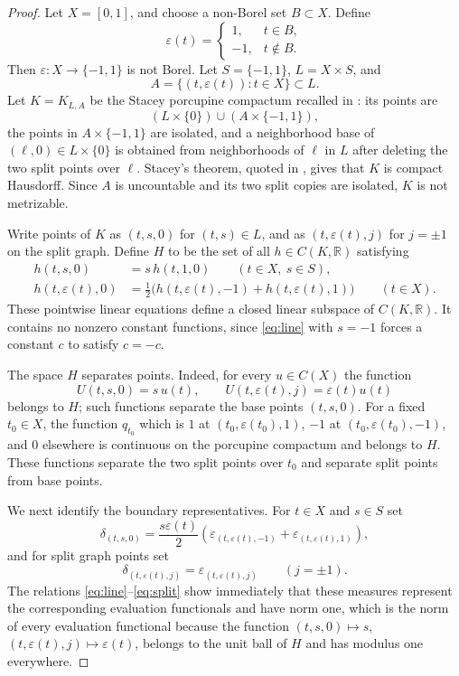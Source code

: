 \documentclass[11pt]{amsart}
\newcommand{\eps}{\varepsilon}
\begin{document}
\begin{proof}
Let \(X=[0,1]\), and choose a non-Borel set \(B\subset X\).  Define
\[
  \eps(t)=
  \begin{cases}
    1, & t\in B,\\
   -1, & t\notin B.
  \end{cases}
\]
Then \(\eps:X\to\{-1,1\}\) is not Borel.  Let \(S=\{-1,1\}\),
\(L=X\times S\), and
\[
  A=\{(t,\eps(t)):t\in X\}\subset L.
\]
Let \(K=K_{L,A}\) be the Stacey porcupine compactum recalled in
\cite[Section 6]{KS}: its points are
\[
  (L\times\{0\})\cup (A\times\{-1,1\}),
\]
the points in \(A\times\{-1,1\}\) are isolated, and a neighborhood base of
\((\ell,0)\in L\times\{0\}\) is obtained from neighborhoods of \(\ell\) in
\(L\) after deleting the two split points over \(\ell\).  Stacey's theorem,
quoted in \cite[Section 6]{KS}, gives that \(K\) is compact Hausdorff.
Since \(A\) is uncountable and its two split copies are isolated, \(K\) is
not metrizable.

Write points of \(K\) as \((t,s,0)\) for \((t,s)\in L\), and as
\((t,\eps(t),j)\) for \(j=\pm1\) on the split graph.  Define \(H\) to be the
set of all \(h\in C(K,\mathbb R)\) satisfying
\begin{align}
  h(t,s,0)&=s\,h(t,1,0) \qquad (t\in X,\ s\in S), \label{eq:line}\\
  h(t,\eps(t),0)&=\frac12\bigl(h(t,\eps(t),-1)+h(t,\eps(t),1)\bigr)
       \qquad (t\in X). \label{eq:split}
\end{align}
These pointwise linear equations define a closed linear subspace of
\(C(K,\mathbb R)\).  It contains no nonzero constant functions, since
\eqref{eq:line} with \(s=-1\) forces a constant \(c\) to satisfy \(c=-c\).

The space \(H\) separates points.  Indeed, for every \(u\in C(X)\) the
function
\[
  U(t,s,0)=s\,u(t), \qquad
  U(t,\eps(t),j)=\eps(t)u(t)
\]
belongs to \(H\); such functions separate the base points \((t,s,0)\).
For a fixed \(t_0\in X\), the function \(q_{t_0}\) which is \(1\) at
\((t_0,\eps(t_0),1)\), \(-1\) at \((t_0,\eps(t_0),-1)\), and \(0\)
elsewhere is continuous on the porcupine compactum and belongs to \(H\).
These functions separate the two split points over \(t_0\) and separate
split points from base points.

We next identify the boundary representatives.  For \(t\in X\) and \(s\in S\)
set
\[
  \delta_{(t,s,0)}
    = \frac{s\eps(t)}{2}
      \left(\varepsilon_{(t,\eps(t),-1)}
            +\varepsilon_{(t,\eps(t),1)}\right),
\]
and for split graph points set
\[
  \delta_{(t,\eps(t),j)}=\varepsilon_{(t,\eps(t),j)}
  \qquad (j=\pm1).
\]
The relations \eqref{eq:line}--\eqref{eq:split} show immediately that these
measures represent the corresponding evaluation functionals and have norm
one, which is the norm of every evaluation functional because the function
\((t,s,0)\mapsto s\), \((t,\eps(t),j)\mapsto \eps(t)\), belongs to the unit
ball of \(H\) and has modulus one everywhere.


\end{proof}
\end{document}
